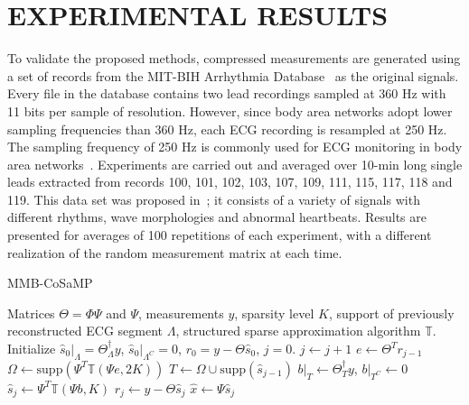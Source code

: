 \documentclass[journal]{IEEEtran}
\begin{document}
\section{EXPERIMENTAL RESULTS}
To validate the proposed methods, compressed measurements are generated using a set of records from the MIT-BIH Arrhythmia Database~\cite{Gold00} as the original signals. Every file in the database contains two lead recordings sampled at 360 Hz with 11 bits per sample of resolution. However, since body area networks adopt lower sampling frequencies than 360 Hz, each ECG recording is resampled at 250 Hz. The sampling frequency of 250 Hz is commonly used for ECG monitoring in body area networks~\cite{Pant10}. Experiments are carried out and averaged over 10-min long single leads extracted from records 100, 101, 102, 103, 107, 109, 111, 115, 117, 118 and 119. This data set was proposed in~\cite{Zhita00}; it consists of a variety of signals with different rhythms, wave morphologies and abnormal heartbeats. Results are presented for averages of 100 repetitions of each experiment, with a different realization of the random measurement matrix at each time.
\begin{algorithm}[t]
\caption{MMB-CoSaMP}\label{alg:alg1}
\begin{algorithmic}[1]
\REQUIRE Matrices $\Theta=\Phi\Psi$ and $\Psi$, measurements $y$, sparsity level $K$, support of previously reconstructed ECG segment $\Lambda$, structured sparse approximation algorithm $\mathbb{T}$.
\STATE Initialize $\hat{s}_0|_{\Lambda}=\Theta_{\Lambda}^\dagger y$, $\hat{s}_0|_{\Lambda^C}=0$, $r_0=y-\Theta\hat{s}_0$, $j=0$.
\STATE $j\leftarrow j+1$
\STATE $e\leftarrow \Theta^T r_{j-1}$
\STATE $\Omega \leftarrow \text{supp}(\Psi^T\mathbb{T}(\Psi e,2K))$
\STATE $T \leftarrow \Omega\cup \text{supp} (\hat{s}_{j-1})$
\STATE $b|_{T} \leftarrow \Theta_{T}^\dagger y $, $b|_{T^C} \leftarrow 0$
\STATE $\hat{s}_{j} \leftarrow \Psi^T\mathbb{T}(\Psi b,K)$
\STATE $r_j \leftarrow y-\Theta\hat{s}_j$
\ENDWHILE
\RETURN $\hat{x} \leftarrow \Psi\hat{s}_j$
\end{algorithmic}
\end{algorithm}
\end{document}
